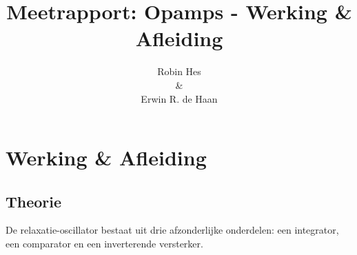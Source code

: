 \documentclass{report}
\title{Meetrapport: Opamps - Werking \& Afleiding}
\author{Robin Hes\\\&\\Erwin R. de Haan}
\begin{document}
\chapter{Werking \& Afleiding}

\section{Theorie}
De relaxatie-oscillator bestaat uit drie afzonderlijke onderdelen: een integrator, een comparator en een inverterende versterker.
\end{document}
